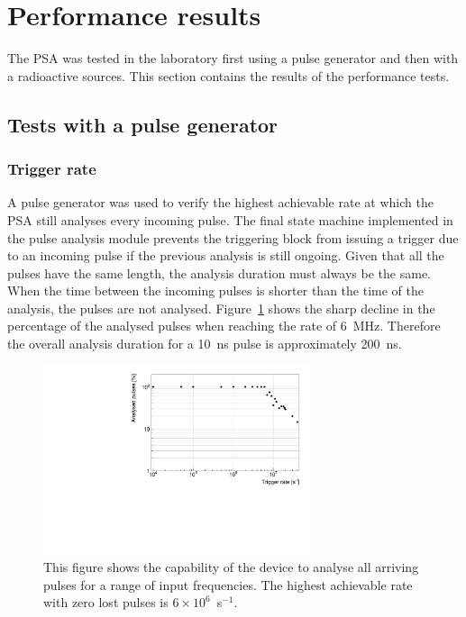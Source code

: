 \section{Performance results}
\label{sec:perres}
The PSA was tested in the laboratory first using a pulse generator and then with a radioactive sources. This section contains the results of the performance tests.

\subsection{Tests with a pulse generator}
\subsubsection{Trigger rate}
A pulse generator was used to verify the highest achievable rate at which the PSA still analyses every incoming pulse. The final state machine implemented in the pulse analysis module prevents the triggering block from issuing a trigger due to an incoming pulse if the previous analysis is still ongoing. Given that all the pulses have the same length, the analysis duration must always be the same. When the time between the incoming pulses is shorter than the time of the analysis, the pulses are not analysed. Figure~\ref{fig:trigrate} shows the sharp decline in the percentage of the analysed pulses when reaching the rate of 6~MHz. Therefore the overall analysis duration for a 10~ns pulse is approximately 200~ns.

\begin{figure}[!t]
\centering
\includegraphics[width=0.7\textwidth]{../scripts/05_current_monitoring/PulseGenTests/plots/freq}
\caption{This figure shows the capability of the device to analyse all arriving pulses for a range of input frequencies. The highest achievable rate with zero lost pulses is $6\times10^6$~s$^{-1}$.}
\label{fig:trigrate}
\end{figure}

